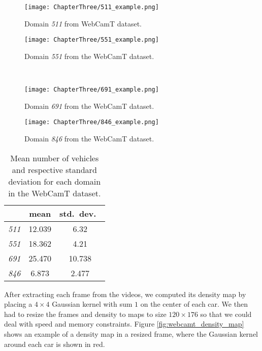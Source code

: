 \begin{figure}[!ht]
	\centering
	\begin{minipage}[b]{0.4\textwidth}
		\texttt{[image: ChapterThree/511\_example.png]}
		\caption{Domain \textit{511} from WebCamT dataset.}
		\label{fig:webcamt_511}
	\end{minipage}
	\hfill
	\begin{minipage}[b]{0.4\textwidth}
		\texttt{[image: ChapterThree/551\_example.png]}
		\caption{Domain \textit{551} from the WebCamT dataset.}
		\label{fig:webcamt_551}
	\end{minipage} \\
	\vspace{1cm}
	\begin{minipage}[b]{0.4\textwidth}
		\texttt{[image: ChapterThree/691\_example.png]}
		\caption{Domain \textit{691} from the WebCamT dataset.}
		\label{fig:webcamt_691}
	\end{minipage} 
	\hfill
	\begin{minipage}[b]{0.4\textwidth}
		\texttt{[image: ChapterThree/846\_example.png]}
		\caption{Domain \textit{846} from the WebCamT dataset.}
		\label{fig:webcamt_846}
	\end{minipage}
\end{figure}

\begin{table}[!ht]
	\centering
	\begin{tabular}{c| c c}
		 & mean & std.\ dev.\  \\
		\hline
		\textit{511} & 12.039 & 6.32 \\
		\textit{551} & 18.362 & 4.21 \\
		\textit{691} & 25.470 & 10.738 \\
		\textit{846} & 6.873 & 2.477 \\
	\end{tabular}
	\caption{Mean number of vehicles and respective standard deviation for each domain in the WebCamT dataset.}
	\label{tab:webcamt_domains}
\end{table}

After extracting each frame from the videos, we computed its density map by placing a $4\times4$ Gaussian kernel with sum $1$ on the center of each car. We then had to resize the frames and density to maps to size $120\times 176$ so that we could deal with speed and memory constraints. Figure \ref{fig:webcamt_density_map} shows an example of a density map in a resized frame, where the Gaussian kernel around each car is shown in red.

